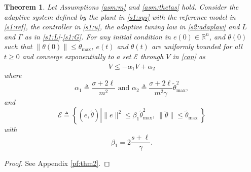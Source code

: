 \documentclass[10pt,journal]{IEEEtran}
\theoremstyle{plain}%
\newtheorem{thm}{Theorem}%
\newtheorem{cor}[thm]{Corollary}
\theoremstyle{definition}
\newcommand{\be}[0]{\begin{equation}}
\newcommand{\ee}[0]{\end{equation}}
\newcommand{\ben}[0]{\begin{equation*}}
\newcommand{\een}[0]{\end{equation*}}
\newcommand{\norms}[1]{\lVert#1\rVert}
\newcommand{\normB}[0]{\norms}
\let\norm=\normB
\renewcommand{\Re}[0]{\mathbb R}
\renewcommand{\IEEEQED}{\IEEEQEDopen}
\begin{document}
\begin{thm}\label{thm:t2}
Let Assumptions \ref{asm:m} and \ref{asm:thetas} hold. Consider the adaptive system defined by the plant in \eqref{s1:sys} with the reference model in \eqref{s1:ref}, the controller in \eqref{s1:u}, the adaptive tuning law in \eqref{s2:adaplaw} and $L$ and $\Gamma$ as in \eqref{s1:L}-\eqref{s1:G}. For any initial condition in $e(0)\in \Re^n$, and $\theta(0)$ such that $\norm{\theta(0)}\leq\theta_\text{max}$, $e(t)$ and $\theta(t)$ are uniformly bounded for all $t\geq0$ and converge exponentially to a set $\mathcal E$ through $V$ in \eqref{can} as
\be\label{V_1}
\dot V \leq - \alpha_1 V + \alpha_2
\ee 
where
\be\label{alpha1}
 \alpha_1  \triangleq \frac{\sigma+2\ell}{m^2}\text{ and }  \alpha_2  \triangleq\frac {\sigma+2\ell} {m^2 \gamma}  \tilde\theta_\text{max}^2,
\ee
and\ben
\mathcal E \triangleq \left\{ (e,\tilde\theta) \left| \norm e^2 \leq \beta_1 \tilde\theta_\text{max}^2, \ 
  \norm{\tilde \theta} \leq \tilde\theta_\text{max }\right.\right \}\een
with 
\be\label{b1}
\beta_1 = 2 \frac{s+\ell}{ \gamma}.
\ee
\end{thm}
\begin{proof}See Appendix \ref{pf:thm2}. \let\IEEEQED\relax \end{proof}

%
\end{document}
